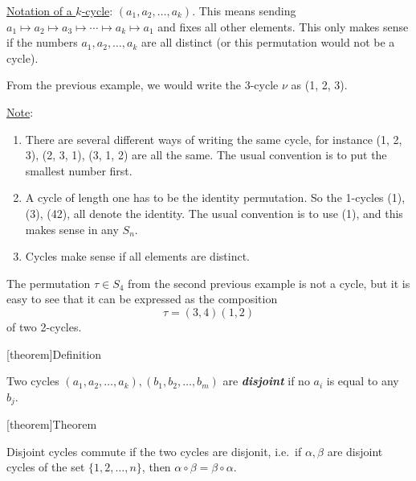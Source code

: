 \documentclass[12pt]{report}
\theoremstyle{definition}
\begin{document}
\underline{Notation of a $k$-cycle}: $(a_1, a_2, \ldots, a_k)$.
This means sending $a_1 \mapsto a_2 \mapsto a_3 \mapsto \cdots \mapsto a_k \mapsto a_1$
and fixes all other elements. This only makes sense if the numbers 
$a_1, a_2, \ldots, a_k$ are all distinct (or this permutation would not be a cycle).

\begin{ex}
    From the previous example, we would write the 3-cycle $\nu$ as (1, 2, 3).
\end{ex}

\noindent\underline{Note}:
\begin{enumerate}[label = (\arabic*)]
    \item There are several different ways of writing the same cycle, for instance
        (1, 2, 3), (2, 3, 1), (3, 1, 2) are all the same. The usual convention is to
        put the smallest number first.

    \item A cycle of length one has to be the identity permutation.
        So the 1-cycles (1), (3), (42), all denote the identity. 
        The usual convention is to use (1), and this makes sense in any $S_n$.

    \item Cycles make sense if all elements are distinct.
\end{enumerate}

\begin{ex}
    The permutation $\tau \in{}S_4$ from the second previous example is not a cycle,
    but it is easy to see that it can be expressed as the composition\[
        \tau = (3,4)(1,2)
    \]of two 2-cycles.
\end{ex}

[theorem]{Definition}
\begin{disjoint cycles}
    Two cycles $(a_1, a_2, \ldots, a_k), (b_1, b_2, \ldots, b_m)$ are \textbf{\emph{disjoint}}
    if no $a_i$ is equal to any $b_j$.
\end{disjoint cycles}

[theorem]{Theorem}
\begin{disjoint cycles commute}
    Disjoint cycles commute if the two cycles are disjonit, i.e.\
    if $\alpha, \beta$ are disjoint cycles of the set $\{1, 2, \ldots, n\}$,
    then $\alpha \circ \beta = \beta \circ \alpha$.
\end{disjoint cycles commute}
\end{document}
